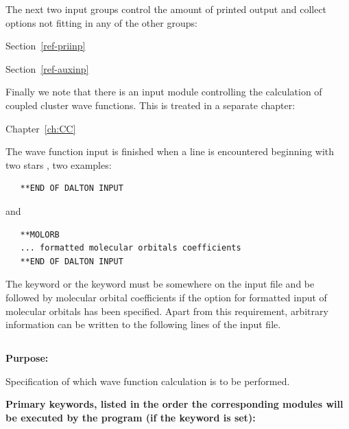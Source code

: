 \noindent
The next two input groups control the amount of printed output and
collect options not fitting in any of the other groups:

Section~\ref{ref-priinp} 

Section~\ref{ref-auxinp} 

\noindent
Finally we note that there is an input module controlling the
calculation of coupled cluster wave functions. This is treated in a
separate chapter:

Chapter~\ref{ch:CC} 

\bigskip
\noindent
The wave function input is finished when a line is encountered beginning
with two stars {\starstarkey}, two examples:

\begin{inputex} \begin{verbatim}
   **END OF DALTON INPUT
\end{verbatim} \end{inputex}
and

\begin{inputex} \begin{verbatim}
   **MOLORB
   ... formatted molecular orbitals coefficients
   **END OF DALTON INPUT
\end{verbatim} \end{inputex}

\noindent
The  keyword or the  keyword
must be somewhere on the input file and be
followed by molecular orbital coefficients if the option for formatted
input of molecular orbitals has been specified.  Apart from this
requirement, arbitrary information can be written to the following lines
of the input file.



\pagebreak[3]
\subsection{\label{ref-geninp}}

{\bf Purpose:}

Specification of which wave function calculation is to be performed.

{\bf Primary keywords, {\color{red} listed in the order the corresponding modules
 will be executed by the program (if the keyword is set)}: }

